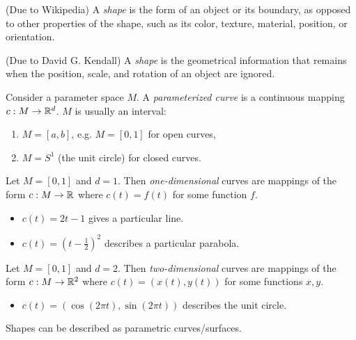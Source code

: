 \begin{defn} (Due to Wikipedia)
    A \emph{shape} is the form of an object or its boundary, as opposed to other properties of the shape, such as its color, texture, material, position, or orientation.
\end{defn}

\begin{defn} (Due to David G. Kendall)
    A \emph{shape} is the geometrical information that remains when the position, scale, and rotation  of an object are ignored.
\end{defn}

\begin{defn}
    Consider a parameter space $M$. A \emph{parameterized curve} is a continuous mapping $c: M \to \mathbb{R}^d$. $M$ is usually an interval:
    \begin{enumerate}
        \item $M = [a, b]$, e.g. $M = [0, 1]$ for open curves,
        \item $M = S^1$ (the unit circle) for closed curves.
    \end{enumerate}
\end{defn}

\begin{exmp}
    Let $M = [0, 1]$ and $d = 1$. Then \emph{one-dimensional} curves are mappings of the form $c: M \to \mathbb{R}$ where $c(t) = f(t)$ for some function $f$.
    \begin{itemize}
        \item $c(t) = 2t - 1$ gives a particular line.
        \item $c(t) = (t - \frac{1}{2})^2$ describes a particular parabola.
    \end{itemize}
\end{exmp}

\begin{exmp}
    Let $M = [0, 1]$ and $d = 2$. Then \emph{two-dimensional} curves are mappings of the form $c: M \to \mathbb{R}^2$ where $c(t) = (x(t), y(t))$ for some functions $x, y$.
    \begin{itemize}
        \item $c(t) = (\cos(2\pi{t}), \sin(2\pi{t}))$ describes the unit circle.
    \end{itemize}
\end{exmp}

\begin{rmk}
    Shapes can be described as parametric curves/surfaces.
\end{rmk}

